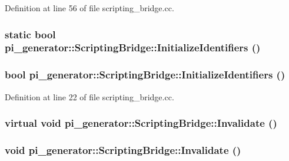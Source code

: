 Definition at line 56 of file scripting\_\-bridge.cc.

\hypertarget{classpi__generator_1_1_scripting_bridge_ab1274471c47d3f5d1a56f3a604e0efff}{
\subsubsection[{InitializeIdentifiers}]{\setlength{\rightskip}{0pt plus 5cm}static bool pi\_\-generator::ScriptingBridge::InitializeIdentifiers ()}}
\label{classpi__generator_1_1_scripting_bridge_ab1274471c47d3f5d1a56f3a604e0efff}
\hypertarget{classpi__generator_1_1_scripting_bridge_a76184c7bc22d728d207e275b5f980d67}{
\subsubsection[{InitializeIdentifiers}]{\setlength{\rightskip}{0pt plus 5cm}bool pi\_\-generator::ScriptingBridge::InitializeIdentifiers ()}}
\label{classpi__generator_1_1_scripting_bridge_a76184c7bc22d728d207e275b5f980d67}


Definition at line 22 of file scripting\_\-bridge.cc.

\hypertarget{classpi__generator_1_1_scripting_bridge_a7b991ca4653d4a447d6a3f8760261780}{
\subsubsection[{Invalidate}]{\setlength{\rightskip}{0pt plus 5cm}virtual void pi\_\-generator::ScriptingBridge::Invalidate ()}}
\label{classpi__generator_1_1_scripting_bridge_a7b991ca4653d4a447d6a3f8760261780}
\hypertarget{classpi__generator_1_1_scripting_bridge_a581ae88aa4acbefc30ae563452ab2fd5}{
\subsubsection[{Invalidate}]{\setlength{\rightskip}{0pt plus 5cm}void pi\_\-generator::ScriptingBridge::Invalidate ()}}
\label{classpi__generator_1_1_scripting_bridge_a581ae88aa4acbefc30ae563452ab2fd5}



